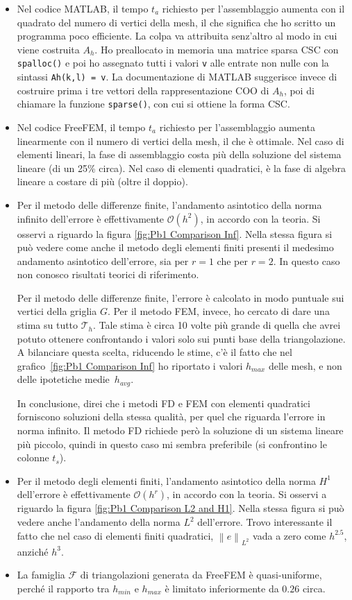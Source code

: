 \documentclass[a4paper]{article}
\newcommand{\bigO}[1]{\mathcal{O}\!\left(#1\right)}
\newcommand{\normltwo}[1]{\left\lVert#1\right\rVert_{L^2}}
\begin{document}
\begin{itemize}
\item Nel codice MATLAB, il tempo $t_a$ richiesto per l'assemblaggio aumenta
	con il quadrato del numero di vertici della mesh, il che significa che ho scritto
	un programma poco efficiente. La colpa va attribuita senz'altro al modo in cui viene
	costruita $A_h$. Ho preallocato in memoria una matrice sparsa CSC con \texttt{spalloc()}
	e poi ho assegnato tutti i valori \texttt{v} alle entrate non nulle con
	la sintassi \texttt{Ah(k,l) = v}.
	La documentazione di MATLAB suggerisce invece di costruire prima i tre vettori
	della rappresentazione COO di $A_h$, poi di chiamare la funzione \texttt{sparse()},
	con cui si ottiene la forma CSC.
\item Nel codice FreeFEM, il tempo $t_a$ richiesto per l'assemblaggio aumenta
	linearmente con il numero di vertici della mesh, il che è ottimale.
	Nel caso di elementi lineari, la fase di assemblaggio costa
	più della soluzione del sistema lineare (di un 25\% circa).
	Nel caso di elementi quadratici,
	è la fase di algebra lineare a costare di più (oltre il doppio).
\item Per il metodo delle differenze finite, l'andamento asintotico
	della norma infinito dell'errore è effettivamente $\bigO{h^2}$,
	in accordo con la teoria.
	Si osservi a riguardo la figura \ref{fig:Pb1 Comparison Inf}.
	Nella stessa figura si può vedere come anche il metodo degli elementi finiti
	presenti il medesimo andamento asintotico dell'errore, sia per $r = 1$ che per $r = 2$.
	In questo caso non conosco risultati teorici di riferimento.
	
	Per il metodo delle differenze finite, l'errore è calcolato in modo puntuale
	sui vertici della griglia $G$.
	Per il metodo FEM, invece, ho cercato di dare una stima su tutto $\mathcal{T}_h$.
	Tale stima è circa 10 volte più grande di quella che avrei potuto ottenere
	confrontando i valori solo sui punti base della triangolazione.
	A bilanciare questa scelta, riducendo le stime, c'è il fatto che nel
	grafico~\ref{fig:Pb1 Comparison Inf} ho riportato i valori $h_{max}$ delle mesh,
	e non delle ipotetiche medie~$h_{avg}$.
	
	In conclusione, direi che i metodi FD e FEM con elementi quadratici
	forniscono soluzioni della stessa qualità,
	per quel che riguarda l'errore in norma infinito.
	Il metodo FD richiede però la soluzione di un sistema lineare più piccolo,
	quindi in questo caso mi sembra preferibile (si confrontino le colonne $t_s$).
\item Per il metodo degli elementi finiti, l'andamento asintotico
	della norma $H^1$ dell'errore è effettivamente $\bigO{h^r}$,
	in accordo con la teoria.
	Si osservi a riguardo la figura \ref{fig:Pb1 Comparison L2 and H1}.
	Nella stessa figura si può vedere anche l'andamento della norma $L^2$
	dell'errore. Trovo interessante il fatto che nel caso di elementi finiti quadratici,
	$\normltwo{e}$ vada a zero come $h^{2.5}$, anziché $h^{3}$.
\item La famiglia $\mathcal{F}$ di triangolazioni generata da FreeFEM è quasi-uniforme,
	perché il rapporto tra $h_{min}$ e $h_{max}$ è limitato inferiormente da $0.26$ circa.
\end{itemize}
\end{document}
